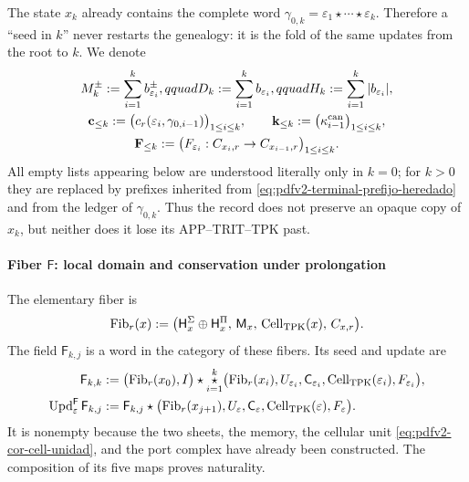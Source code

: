 The state \(x_k\) already contains the complete word
\(\gamma_{0,k}=\varepsilon_1\star\cdots\star\varepsilon_k\). Therefore a
``seed in \(k\)'' never restarts the genealogy: it is the fold of the same
updates from the root to \(k\). We denote
\begin{equation}
\label{eq:pdfv2-terminal-prefijo-heredado}
 \begin{gathered}
 M_k^\pm:=\sum_{i=1}^{k}b_{\varepsilon_i}^\pm,qquad
 D_k:=\sum_{i=1}^{k}b_{\varepsilon_i},qquad
 H_k:=\sum_{i=1}^{k}|b_{\varepsilon_i}|,\\
 \mathbf c_{\leq k}:=
  \bigl(c_r(\varepsilon_i,\gamma_{0,i-1})\bigr)_{1\leq i\leq k},
 \qquad
 \mathbf k_{\leq k}:=
  \bigl(\kappa_{i-1}^{\rm can}\bigr)_{1\leq i\leq k},\\
 \mathbf F_{\leq k}:=
  \bigl(F_{\varepsilon_i}:C_{x_i,r}\to C_{x_{i-1},r}\bigr)_{1\leq i\leq k}.
 \end{gathered}
\end{equation}
All empty lists appearing below are understood literally only
in \(k=0\); for \(k>0\) they are replaced by prefixes inherited from
\eqref{eq:pdfv2-terminal-prefijo-heredado} and from the ledger of
\(\gamma_{0,k}\). Thus the record does not preserve an opaque copy of \(x_k\),
but neither does it lose its APP--TRIT--TPK past.

\paragraph{Fiber \(\mathsf F\): local domain and conservation under prolongation}
The elementary fiber is
\begin{equation}
\label{eq:pdfv2-terminal-tipo-fibra}
 \operatorname{Fib}_r(x):=
 \bigl(\mathsf H_x^\Sigma\oplus\mathsf H_x^\Pi,\,
       \mathsf M_x,\,
       \operatorname{Cell}_{\rm TPK}(x),\,C_{x,r}\bigr).
\end{equation}
The field \(\mathsf F_{k,j}\) is a word in the category of these fibers.
Its seed and update are
\begin{align}
 \mathsf F_{k,k}
 &:=\bigl(\operatorname{Fib}_r(x_0),I\bigr)\star
 \mathop{\star}_{i=1}^{k}
 \bigl(\operatorname{Fib}_r(x_i),U_{\varepsilon_i},
 \mathsf C_{\varepsilon_i},\operatorname{Cell}_{\rm TPK}(\varepsilon_i),
 F_{\varepsilon_i}\bigr),
 \label{eq:pdfv2-terminal-semilla-f}\\
 \operatorname{Upd}^{\mathsf F}_{\varepsilon}\mathsf F_{k,j}
 &:=
 \mathsf F_{k,j}\star
 \bigl(\operatorname{Fib}_r(x_{j+1}),U_\varepsilon,
 \mathsf C_\varepsilon,\operatorname{Cell}_{\rm TPK}(\varepsilon),
 F_\varepsilon\bigr).
 \label{eq:pdfv2-terminal-update-f}
\end{align}
It is nonempty because the two sheets, the memory, the cellular unit
\eqref{eq:pdfv2-cor-cell-unidad}, and the port complex have already been
constructed. The composition of its five maps proves naturality.

